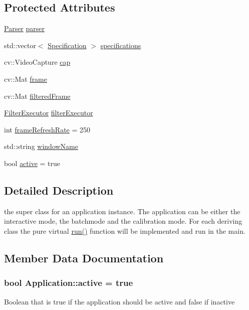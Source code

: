 \subsection*{Protected Attributes}
\begin{DoxyCompactItemize}
\item 
\hyperlink{classParser}{Parser} \hyperlink{classApplication_ad80c2b36d4feb33d203f112d3c890409}{parser}
\item 
std\+::vector$<$ \hyperlink{structSpecification}{Specification} $>$ \hyperlink{classApplication_a041aed976aa156e8265bca7f39c42302}{specifications}
\item 
cv\+::\+Video\+Capture \hyperlink{classApplication_acb0907e73dc0c973aebcf66e34b8034b}{cap}
\item 
cv\+::\+Mat \hyperlink{classApplication_ab33d5d3c05c0077079ed1c9cb66e1775}{frame}
\item 
cv\+::\+Mat \hyperlink{classApplication_a144fb1278bc5e80882b0bd75f077289c}{filtered\+Frame}
\item 
\hyperlink{classFilterExecutor}{Filter\+Executor} \hyperlink{classApplication_a8c2095659954e5914e8be3669264ca61}{filter\+Executor}
\item 
int \hyperlink{classApplication_a181348e18b3debfa1fa2ba936f20967d}{frame\+Refresh\+Rate} = 250
\item 
std\+::string \hyperlink{classApplication_a931b9ffa386916ba1cfd1804823bf51b}{window\+Name}
\item 
bool \hyperlink{classApplication_a09114f3400be3c9907a53be6ec4862af}{active} = true
\end{DoxyCompactItemize}


\subsection{Detailed Description}
the super class for an application instance. The application can be either the interactive mode, the batchmode and the calibration mode. For each deriving class the pure virtual \hyperlink{classApplication_a7dd8e91a715194dd391be7ae3ecdd985}{run()} function will be implemented and run in the main. 

\subsection{Member Data Documentation}
\subsubsection[{\texorpdfstring{active}{active}}]{\setlength{\rightskip}{0pt plus 5cm}bool Application\+::active = true\hspace{0.3cm}{\ttfamily [protected]}}\hypertarget{classApplication_a09114f3400be3c9907a53be6ec4862af}{}\label{classApplication_a09114f3400be3c9907a53be6ec4862af}
Boolean that is true if the application should be active and false if inactive 
